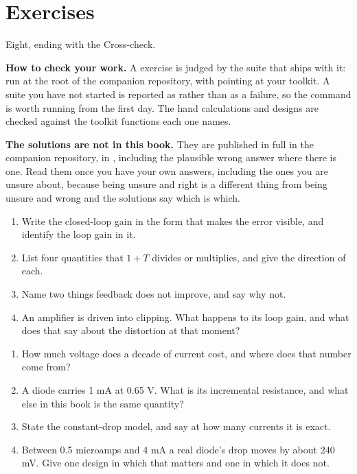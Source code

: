 
\section{Exercises}
\label{c4:sec:exercises}

Eight, ending with the Cross-check.

\begin{aside}
\textbf{How to check your work.} A  exercise is judged by the suite that ships with it: run  at the root of the companion repository, with  pointing at your toolkit. A suite you have not started is reported as  rather than as a failure, so the command is worth running from the first day. The hand calculations and designs are checked against the toolkit functions each one names.

\textbf{The solutions are not in this book.} They are published in full in the companion repository, in , including the plausible wrong answer where there is one. Read them once you have your own answers, including the ones you are unsure about, because being unsure and right is a different thing from being unsure and wrong and the solutions say which is which.
\end{aside}

\label{c4:ex:1}
\begin{enumerate}
  \item Write the closed-loop gain in the form that makes the error visible, and identify the loop gain in it.
  \item List four quantities that $1 + T$ divides or multiplies, and give the direction of each.
  \item Name two things feedback does not improve, and say why not.
  \item An amplifier is driven into clipping. What happens to its loop gain, and what does that say about the distortion at that moment?
\end{enumerate}

\label{c4:ex:2}
\begin{enumerate}
  \item How much voltage does a decade of current cost, and where does that number come from?
  \item A diode carries 1 mA at 0.65 V. What is its incremental resistance, and what else in this book is the same quantity?
  \item State the constant-drop model, and say at how many currents it is exact.
  \item Between 0.5 microamps and 4 mA a real diode's drop moves by about 240 mV. Give one design in which that matters and one in which it does not.
\end{enumerate}

